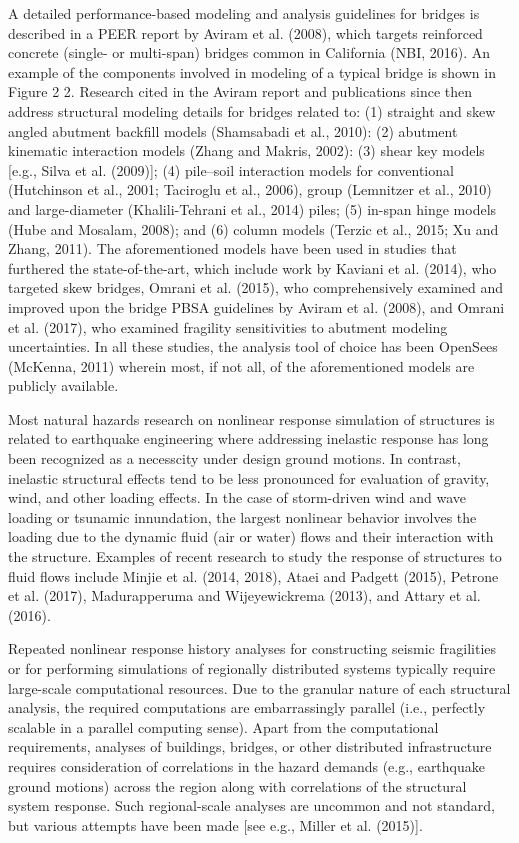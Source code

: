 A detailed performance-based modeling and analysis guidelines for bridges is described in a PEER report by Aviram et al. (2008), which targets reinforced concrete (single- or multi-span) bridges common in California (NBI, 2016). An example of the components involved in modeling of a typical bridge is shown in Figure 2 2. Research cited in the Aviram report and publications since then address structural modeling details for bridges related to: (1) straight and skew angled abutment backfill models (Shamsabadi et al., 2010): (2) abutment kinematic interaction models (Zhang and Makris, 2002): (3) shear key models [e.g., Silva et al. (2009)]; (4) pile–soil interaction models for conventional (Hutchinson et al., 2001; Taciroglu et al., 2006), group (Lemnitzer et al., 2010) and large-diameter (Khalili-Tehrani et al., 2014) piles; (5) in-span hinge models (Hube and Mosalam, 2008); and (6) column models (Terzic et al., 2015; Xu and Zhang, 2011). The aforementioned models have been used in studies that furthered the state-of-the-art, which include work by Kaviani et al. (2014), who targeted skew bridges, Omrani et al. (2015), who comprehensively examined and improved upon the bridge PBSA guidelines by Aviram et al. (2008), and Omrani et al. (2017), who examined fragility sensitivities to abutment modeling uncertainties. In all these studies, the analysis tool of choice has been OpenSees (McKenna, 2011) wherein most, if not all, of the aforementioned models are publicly available. 

Most natural hazards research on nonlinear response simulation of structures is related to earthquake engineering where addressing inelastic response has long been recognized as a necesscity under design ground motions. In contrast, inelastic structural effects tend to be less pronounced for evaluation of gravity, wind, and other loading effects. In the case of storm-driven wind and wave loading or tsunamic innundation, the largest nonlinear behavior involves the loading due to the dynamic fluid (air or water) flows and their interaction with the structure. Examples of recent research to study the response of structures to fluid flows include Minjie et al. (2014, 2018), Ataei and Padgett (2015), Petrone et al. (2017), Madurapperuma and Wijeyewickrema (2013), and Attary et al. (2016).

Repeated nonlinear response history analyses for constructing seismic fragilities or for performing simulations of regionally distributed systems typically require large-scale computational resources. Due to the granular nature of each structural analysis, the required computations are embarrassingly parallel (i.e., perfectly scalable in a parallel computing sense). Apart from the computational requirements, analyses of buildings, bridges, or other distributed infrastructure requires consideration of correlations in the hazard demands (e.g., earthquake ground motions) across the region along with correlations of the structural system response. Such regional-scale analyses are uncommon and not standard, but various attempts have been made [see e.g., Miller et al. (2015)].

